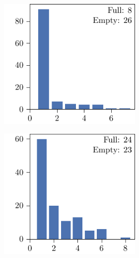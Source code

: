 \begin{figure}[p]
\begin{subfigure}{\textwidth}
\begin{subfigure}{\mymultiouter}
    \end{subfigure}
  \end{subfigure}
  \centering
  \begin{subfigure}{\textwidth}
    \centering
    \begin{subfigure}{\mymultiouter}
        \centering
          \includegraphics[width=\mymultiinner]{figures/new/relaxed_common-wine-qlibra-permutation}
    \end{subfigure}
    \begin{subfigure}{\mymultiouter}
        \centering
          \includegraphics[width=\mymultiinner]{figures/new/relaxed_common-wine-qlibra-retraining}
    \end{subfigure}
    \begin{subfigure}{\mymultiouter}
        \centering

\end{subfigure}
\end{subfigure}
\end{figure}
